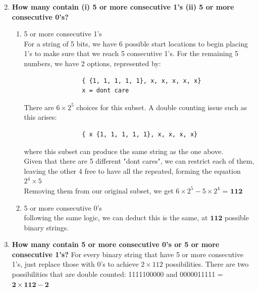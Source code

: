 \documentclass{article}
\begin{document}
    \begin{enumerate}[label=(\alph*)]
        \setcounter{enumi}{1}
        \item \textbf{How many contain (i) 5 or more consecutive 1's (ii) 5 or more consecutive 0's?}
        \begin{enumerate}[label=(\roman*)]
            \item 5 or more consecutive 1's
            \\ For a string of 5 bits, we have 6 possible start locations to begin placing 1's to make 
            sure that we reach 5 consecutive 1's. For the remaining 5 numbers, we have 2 options, represented
            by:
            \begin{verbatim}
                { {1, 1, 1, 1, 1}, x, x, x, x, x}
                x = dont care
            \end{verbatim}
            There are $6 \times 2^5$ choices for this subset. A double counting issue such as this arises:
            \begin{verbatim}
                { x {1, 1, 1, 1, 1}, x, x, x, x}
            \end{verbatim}
            where this subset can produce the same string as the one above.\\
            Given that there are 5 different "dont cares", we can restrict each of them, leaving the other 4 free to have all the repeated, forming the equation $2^4 \times 5$\\
            Removing them from our original subset, we get $6 \times 2^5 - 5 \times 2^4$ = {\LARGE $\boxed{\mathbf{112}}$}
            \item 5 or more consecutive 0's
            \\ following the same logic, we can deduct this is the same, at {\LARGE $\boxed{\mathbf{112}}$}
            possible binary strings.
        \end{enumerate}
        \item \textbf{How many contain 5 or more consecutive 0’s or 5 or more consecutive 1’s?}
        For every binary string that have 5 or more consecutive 1's, just replace those with 0's
        to achieve $2 \times 112$ possibilities. There are two possibilities that are double
        counted: 1111100000 and 0000011111 = {\LARGE $\boxed{\mathbf{2 \times 112 - 2}}$}
    \end{enumerate}
\end{document}
